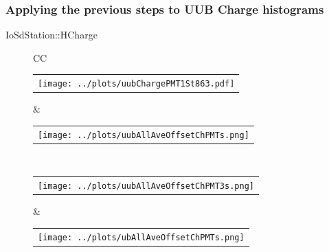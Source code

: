 \documentclass[aspectratio=169]{beamer}
\begin{document}
\begin{frame}
	\frametitle{Applying the previous steps to UUB Charge histograms}
	{IoSdStation::HCharge}
	\begin{figure}
		\centering
		\begin{tabularx}{\textwidth}{CC}
			\\
			\begin{tabular}{l}
				\texttt{[image: ../plots/uubChargePMT1St863.pdf]}
			\end{tabular}
      &
      \begin{tabular}{l}
        \texttt{[image: ../plots/uubAllAveOffsetChPMTs.png]}
      \end{tabular}
      \\
      \begin{tabular}{l}
        \texttt{[image: ../plots/uubAllAveOffsetChPMT3s.png]}
      \end{tabular}
      &
      \begin{tabular}{l}
        \texttt{[image: ../plots/ubAllAveOffsetChPMTs.png]}
      \end{tabular}
		\end{tabularx}
	\end{figure}
\end{frame}



\end{document}

